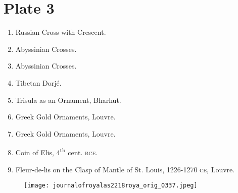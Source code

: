 \documentclass[a4paper, 11pt, oneside, english]{article}
\begin{document}
\section*{Plate 3}
\begin{enumerate}
    \item Russian Cross with Crescent.

    \item Abyssinian Crosses.

    \item Abyssinian Crosses.

    \item Tibetan Dorjé.

    \item Trisula as an Ornament, Bharhut.

    \item Greek Gold Ornaments, Louvre.

    \item Greek Gold Ornaments, Louvre.

    \item Coin of Elis, 4\textsuperscript{th} cent. \textsc{bce}.

    \item Fleur-de-lis on the Clasp of Mantle of St. Louis, 1226-1270 \textsc{ce}, Louvre.
\end{enumerate}
\vspace*{\fill}  
\clearpage
\clearpage
\vspace*{\fill}  
\begin{figure}[H]
\centering
\texttt{[image: journalofroyalas2218roya\_orig\_0337.jpeg]}
\end{figure}
\vspace*{\fill} 
\clearpage
{}
\vspace*{\fill}  
\end{document}
